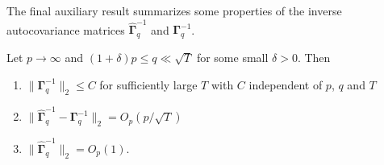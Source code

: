 The final auxiliary result summarizes some properties of the inverse autocovariance matrices $\widehat{\boldsymbol{\Gamma}}_q^{-1}$ and $\boldsymbol{\Gamma}_q^{-1}$.
%
%
\begin{lemmaA}\label{lemma-lrv-3}
Let $p \rightarrow \infty$ and $(1+\delta)p \le q \ll \sqrt{T}$ for some small $\delta > 0$. Then 
\begin{enumerate}[label=(\roman*),leftmargin=0.85cm]
\item $\| \boldsymbol{\Gamma}_q^{-1} \|_2 \le C$ for sufficiently large $T$ with $C$ independent of $p$, $q$ and $T$
\item $\| \widehat{\boldsymbol{\Gamma}}_q^{-1} - \boldsymbol{\Gamma}_q^{-1} \|_2 = O_p(p/\sqrt{T})$ 
\item $\| \widehat{\boldsymbol{\Gamma}}_q^{-1} \|_2 = O_p(1)$. 
\end{enumerate}
\end{lemmaA}
%
%
